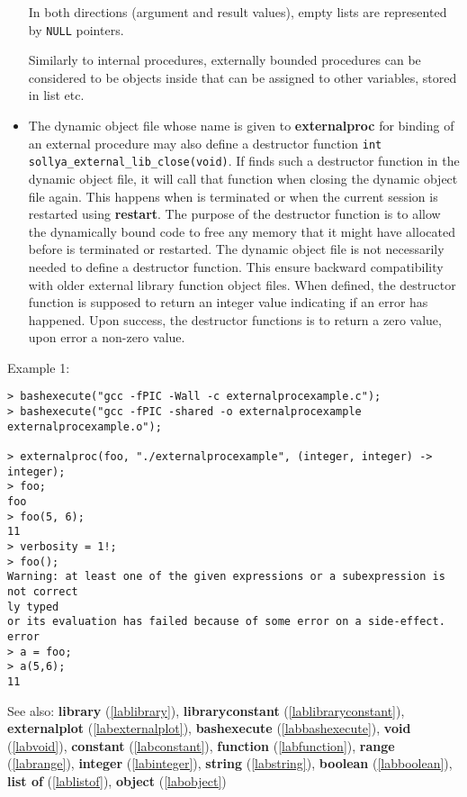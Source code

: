 \begin{itemize}
   In both directions (argument and result values), empty lists are represented
   by \texttt{NULL} pointers.
    
   Similarly to internal procedures, externally bounded procedures can be
   considered to be objects inside \sollya that can be assigned to other
   variables, stored in list etc.

\item The dynamic object file whose name is given to \textbf{externalproc} for binding of an
   external procedure may also define a destructor function \verb|int sollya_external_lib_close(void)|.
   If \sollya finds such a destructor function in the dynamic object file, it will call 
   that function when closing the dynamic object file again. This happens when \sollya
   is terminated or when the current \sollya session is restarted using \textbf{restart}.
   The purpose of the destructor function is to allow the dynamically bound code
   to free any memory that it might have allocated before \sollya is terminated 
   or restarted. 
   The dynamic object file is not necessarily needed to define a destructor
   function. This ensure backward compatibility with older \sollya external 
   library function object files.
   When defined, the destructor function is supposed to return an integer
   value indicating if an error has happened. Upon success, the destructor
   functions is to return a zero value, upon error a non-zero value.
\end{itemize}
\noindent Example 1: 
\begin{center}\begin{minipage}{15cm}\begin{Verbatim}[frame=single]
> bashexecute("gcc -fPIC -Wall -c externalprocexample.c");
> bashexecute("gcc -fPIC -shared -o externalprocexample externalprocexample.o");

> externalproc(foo, "./externalprocexample", (integer, integer) -> integer);
> foo;
foo
> foo(5, 6);
11
> verbosity = 1!;
> foo();
Warning: at least one of the given expressions or a subexpression is not correct
ly typed
or its evaluation has failed because of some error on a side-effect.
error
> a = foo;
> a(5,6);
11
\end{Verbatim}
\end{minipage}\end{center}
See also: \textbf{library} (\ref{lablibrary}), \textbf{libraryconstant} (\ref{lablibraryconstant}), \textbf{externalplot} (\ref{labexternalplot}), \textbf{bashexecute} (\ref{labbashexecute}), \textbf{void} (\ref{labvoid}), \textbf{constant} (\ref{labconstant}), \textbf{function} (\ref{labfunction}), \textbf{range} (\ref{labrange}), \textbf{integer} (\ref{labinteger}), \textbf{string} (\ref{labstring}), \textbf{boolean} (\ref{labboolean}), \textbf{list of} (\ref{lablistof}), \textbf{object} (\ref{labobject})
